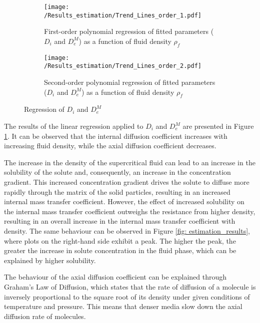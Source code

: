 \documentclass[../Article_Model_Parameters.tex]{subfiles}
\begin{document}
	\begin{figure}[!h]
	\centering
	\begin{subfigure}[b]{\columnwidth}
		\centering
		\texttt{[image: /Results\_estimation/Trend\_Lines\_order\_1.pdf]}
		\caption{First-order polynomial regression of fitted parameters ($D_i$ and $D_e^M$) as a function of fluid density $\rho_f$}
		\label{fig:Regression_1}
	\end{subfigure}
	\begin{subfigure}[b]{\columnwidth}
		\centering
		\texttt{[image: /Results\_estimation/Trend\_Lines\_order\_2.pdf]}
		\caption{Second-order polynomial regression of fitted parameters ($D_i$ and $D_e^M$) as a function of fluid density $\rho_f$}
		\label{fig:Regression_2}
	\end{subfigure}
	\caption{Regression of $D_i$ and $D_e^M$} 
	\label{fig:Regression}
	\end{figure}

	The results of the linear regression applied to $D_i$ and $D_e^M$ are presented in Figure \ref{fig:Regression_1}. It can be observed that the internal diffusion coefficient increases with increasing fluid density, while the axial diffusion coefficient decreases.
	
	The increase in the density of the supercritical fluid can lead to an increase in the solubility of the solute and, consequently, an increase in the concentration gradient. This increased concentration gradient drives the solute to diffuse more rapidly through the matrix of the solid particles, resulting in an increased internal mass transfer coefficient. However, the effect of increased solubility on the internal mass transfer coefficient outweighs the resistance from higher density, resulting in an overall increase in the internal mass transfer coefficient with density. The same behaviour can be observed in Figure \ref{fig: estimation_results}, where plots on the right-hand side exhibit a peak. The higher the peak, the greater the increase in solute concentration in the fluid phase, which can be explained by higher solubility.
	
	The behaviour of the axial diffusion coefficient can be explained through Graham’s Law of Diffusion, which states that the rate of diffusion of a molecule is inversely proportional to the square root of its density under given conditions of temperature and pressure. This means that denser media slow down the axial diffusion rate of molecules. 
	
\end{document}
